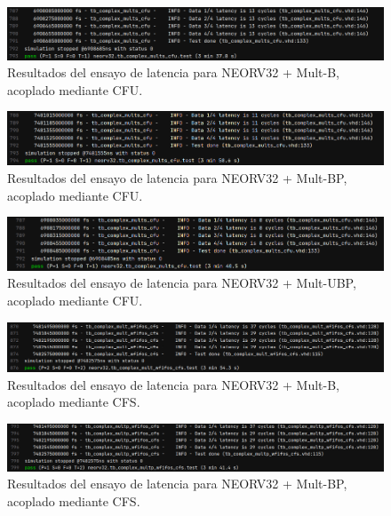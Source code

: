 \begin{figure}[H]
    \centering
    \includegraphics[width=14cm]{Figuras/result/lat9.png}
    \caption{Resultados del ensayo de latencia para NEORV32 + Mult-B, acoplado mediante CFU.}
    \label{fig:lat9}
\end{figure}

\begin{figure}[H]
    \centering
    \includegraphics[width=14cm]{Figuras/result/lat10.png}
    \caption{Resultados del ensayo de latencia para NEORV32 + Mult-BP, acoplado mediante CFU.}
    \label{fig:lat10}
\end{figure}

\begin{figure}[H]
    \centering
    \includegraphics[width=14cm]{Figuras/result/lat11.png}
    \caption{Resultados del ensayo de latencia para NEORV32 + Mult-UBP, acoplado mediante CFU.}
    \label{fig:lat11}
\end{figure}

\begin{figure}[H]
    \centering
    \includegraphics[width=14cm]{Figuras/result/lat12.png}
    \caption{Resultados del ensayo de latencia para NEORV32 + Mult-B, acoplado mediante CFS.}
    \label{fig:lat12}
\end{figure}

\begin{figure}[H]
    \centering
    \includegraphics[width=14cm]{Figuras/result/lat13.png}
    \caption{Resultados del ensayo de latencia para NEORV32 + Mult-BP, acoplado mediante CFS.}
    \label{fig:lat13}
\end{figure}


